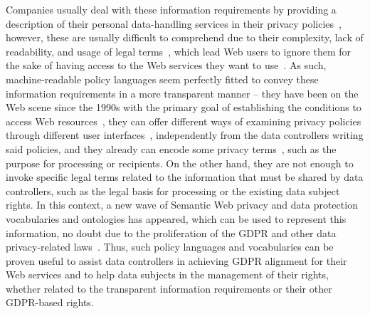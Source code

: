Companies usually deal with these information requirements by providing a description of their personal data-handling services in their privacy policies~\citep{linden_privacy_2020}, however, these are usually difficult to comprehend due to their complexity, lack of readability, and usage of legal terms~\citep{mcdonald_cost_2008,pasquale_black_2015,fabian_largescale_2017,lovato_more_2023}, which lead Web users to ignore them for the sake of having access to the Web services they want to use~\citep{gindin_nobody_2009,rudolph_why_2018,obar_biggest_2020}.
As such, machine-readable policy languages seem perfectly fitted to convey these information requirements in a more transparent manner -- they have been on the Web scene since the 1990s with the primary goal of establishing the conditions to access Web resources~\citep{zhao_privacy_2016,pellegrini_genealogy_2018,leicht_survey_2019}, they can offer different ways of examining privacy policies through different user interfaces~\citep{angulo_towards_2012,gerl_let_2020}, independently from the data controllers writing said policies, and they already can encode some privacy terms~\citep{cranor_platform_2002,iannella_odrl_2018}, such as the purpose for processing or recipients.
On the other hand, they are not enough to invoke specific legal terms related to the information that must be shared by data controllers, such as the legal basis for processing or the existing data subject rights.
In this context, a new wave of Semantic Web privacy and data protection vocabularies and ontologies has appeared, which can be used to represent this information, no doubt due to the proliferation of the GDPR and other data privacy-related laws~\citep{pandit_representing_2020,esteves_analysis_2022}.
Thus, such policy languages and vocabularies can be proven useful to assist data controllers in achieving GDPR alignment for their Web services and to help data subjects in the management of their rights, whether related to the transparent information requirements or their other GDPR-based rights.

